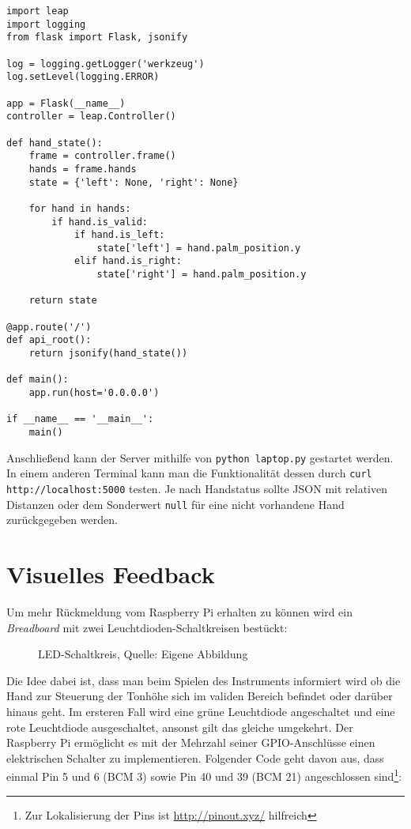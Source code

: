 \documentclass[a4paper, fontsize=12pt, toc=bibliographynumbered]{scrreprt}
\newcommand{\mono}[1]{\texttt{#1}}
\newcommand{\abbildung}[3]{\begin{figure}[H]\centering
    \fbox{\texttt{[image: \#2]}}\caption{#3}
    \label{fig:#2}\end{figure}}
\begin{document}
\begin{verbatim}
import leap
import logging
from flask import Flask, jsonify

log = logging.getLogger('werkzeug')
log.setLevel(logging.ERROR)

app = Flask(__name__)
controller = leap.Controller()

def hand_state():
    frame = controller.frame()
    hands = frame.hands
    state = {'left': None, 'right': None}

    for hand in hands:
        if hand.is_valid:
            if hand.is_left:
                state['left'] = hand.palm_position.y
            elif hand.is_right:
                state['right'] = hand.palm_position.y

    return state

@app.route('/')
def api_root():
    return jsonify(hand_state())

def main():
    app.run(host='0.0.0.0')

if __name__ == '__main__':
    main()
\end{verbatim}

Anschließend kann der Server mithilfe von \mono{python laptop.py}
gestartet werden.  In einem anderen Terminal kann man die
Funktionalität dessen durch \mono{curl http://localhost:5000} testen.
Je nach Handstatus sollte JSON mit relativen Distanzen oder dem
Sonderwert \mono{null} für eine nicht vorhandene Hand zurückgegeben
werden.

\section{Visuelles Feedback}

Um mehr Rückmeldung vom Raspberry Pi erhalten zu können wird ein
\emph{Breadboard} mit zwei Leuchtdioden-Schaltkreisen bestückt:

\abbildung{0.8}{LED}{LED-Schaltkreis, Quelle: Eigene Abbildung}

Die Idee dabei ist, dass man beim Spielen des Instruments informiert
wird ob die Hand zur Steuerung der Tonhöhe sich im validen Bereich
befindet oder darüber hinaus geht.  Im ersteren Fall wird eine grüne
Leuchtdiode angeschaltet und eine rote Leuchtdiode ausgeschaltet,
ansonst gilt das gleiche umgekehrt.  Der Raspberry Pi ermöglicht es
mit der Mehrzahl seiner GPIO-Anschlüsse einen elektrischen Schalter zu
implementieren.  Folgender Code geht davon aus, dass einmal Pin 5 und
6 (BCM 3) sowie Pin 40 und 39 (BCM 21) angeschlossen sind\footnote{Zur
  Lokalisierung der Pins ist \url{http://pinout.xyz/} hilfreich}:
\end{document}
